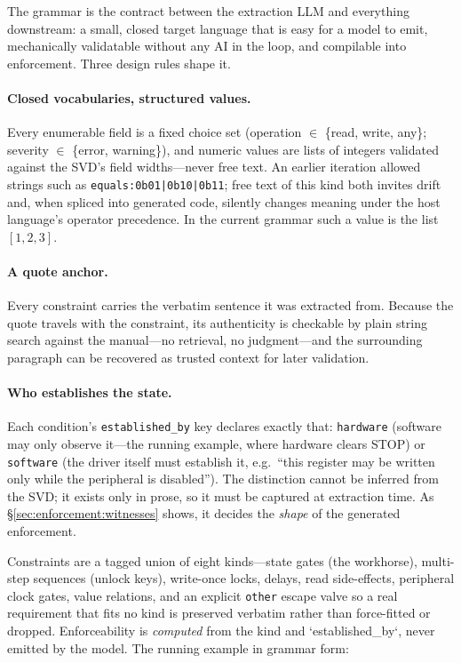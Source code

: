 The grammar is the contract between the extraction LLM and everything
downstream: a small, closed target language that is easy for a model to emit,
mechanically validatable without any AI in the loop, and compilable into
enforcement. Three design rules shape it.

\paragraph{Closed vocabularies, structured values.}
Every enumerable field is a fixed choice set (operation $\in$ \{read, write,
any\}; severity $\in$ \{error, warning\}), and numeric values are
lists of integers validated against the SVD's field widths---never free
text. An earlier iteration allowed strings such as
\texttt{equals:0b01|0b10|0b11}; free text of this kind both invites drift
and, when spliced into generated code, silently changes meaning under the
host language's operator precedence. In the current grammar such a value is
the list $[1, 2, 3]$.

\paragraph{A quote anchor.}
Every constraint carries the verbatim sentence it was extracted from.
Because the quote travels with the constraint, its authenticity is checkable
by plain string search against the manual---no retrieval, no judgment---and
the surrounding paragraph can be recovered as trusted context for later
validation.

\paragraph{Who establishes the state.}
Each condition's \texttt{established\_by} key declares exactly that: \texttt{hardware}
(software may only observe it---the running example, where hardware clears
STOP) or \texttt{software} (the driver itself must establish it, e.g.\ ``this
register may be written only while the peripheral is disabled''). The
distinction cannot be inferred from the SVD; it exists only in prose, so it
must be captured at extraction time. As \S\ref{sec:enforcement:witnesses}
shows, it decides the \emph{shape} of the generated enforcement.

Constraints are a tagged union of eight kinds---state gates (the workhorse),
multi-step sequences (unlock keys), write-once locks, delays, read
side-effects, peripheral clock gates, value relations, and an explicit
\texttt{other} escape valve so a real requirement that fits no kind is
preserved verbatim rather than force-fitted or dropped. Enforceability is
\emph{computed} from the kind and `established_by`, never emitted by the model.
The running example in grammar form:

